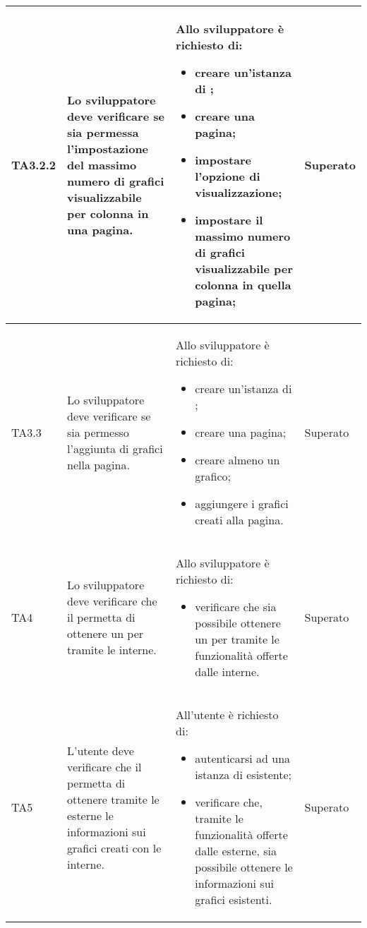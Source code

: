 \begin{longtabu}{| X[0.5] | X | X | X[0.5] |}
	TA3.2.2 & Lo sviluppatore deve verificare se sia permessa l'impostazione del massimo numero di grafici visualizzabile per colonna in una pagina.
		
		& Allo sviluppatore è richiesto di:
		\begin{itemize}
			\item creare un'istanza di \projectname{};
			\item creare una pagina;
			\item impostare l'opzione di visualizzazione;
			\item impostare il massimo numero di grafici visualizzabile per colonna in quella pagina;
		\end{itemize}
& Superato \\ \hline

	TA3.3 & Lo sviluppatore deve verificare se sia permesso l'aggiunta di grafici nella pagina.
		
		& Allo sviluppatore è richiesto di:
		\begin{itemize}
			\item creare un'istanza di \projectname{};
			\item creare una pagina;
			\item creare almeno un grafico;
			\item aggiungere i grafici creati alla pagina.
		\end{itemize}
& Superato \\ \hline

	TA4 & Lo sviluppatore deve verificare che il  permetta di ottenere un  per  tramite le  interne.
		
		& Allo sviluppatore è richiesto di:
		\begin{itemize}
			\item verificare che sia possibile ottenere un  per  tramite le funzionalità offerte dalle  interne.
		\end{itemize}
& Superato \\ \hline

	TA5 & L'utente  deve verificare che il  permetta di ottenere tramite le  esterne le informazioni sui grafici creati con le  interne.

		& All'utente  è richiesto di:
		\begin{itemize}
			\item autenticarsi ad una istanza di \projectname{} esistente;
			\item verificare che, tramite le funzionalità offerte dalle  esterne, sia possibile ottenere le informazioni sui grafici esistenti.
		\end{itemize}
& Superato \\ \hline


\end{longtabu}
